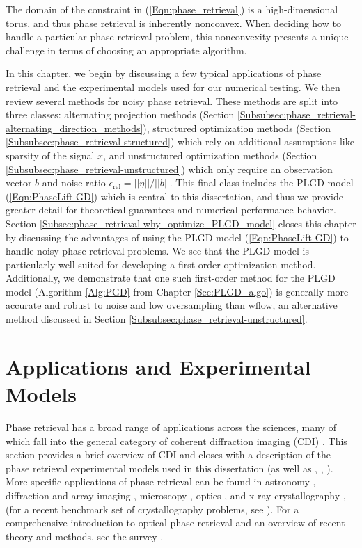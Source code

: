 The domain of the constraint in (\ref{Eqn:phase_retrieval}) is a high-dimensional torus, and thus phase retrieval is inherently nonconvex.  When deciding how to handle a particular phase retrieval problem, this  nonconvexity presents a unique challenge in terms of choosing an appropriate algorithm.  


In this chapter, we begin by discussing a few typical applications of phase retrieval and the experimental models used for our numerical testing.  
We then review several methods for noisy phase retrieval.  
These methods are split into three classes: alternating projection methods (Section \ref{Subsubsec:phase_retrieval-alternating_direction_methods}), structured optimization methods (Section \ref{Subsubsec:phase_retrieval-structured}) which rely on additional assumptions like sparsity of the signal $x$, and unstructured optimization methods (Section \ref{Subsubsec:phase_retrieval-unstructured}) which only require an observation vector $b$ and noise ratio $\epsilon_{\text{rel}} = ||\eta|| / ||b||$.  
This final class includes the PLGD model (\ref{Eqn:PhaseLift-GD}) which is central to this dissertation, and thus we provide greater detail for theoretical guarantees and numerical performance behavior.
Section \ref{Subsec:phase_retrieval-why_optimize_PLGD_model} closes this chapter by discussing the advantages of using the PLGD model (\ref{Eqn:PhaseLift-GD}) to handle noisy phase retrieval problems.
We see that the PLGD model is particularly well suited for developing a first-order optimization method.
Additionally, we demonstrate that one such first-order method for the PLGD model (Algorithm \ref{Alg:PGD} from Chapter \ref{Sec:PLGD_algo}) is generally more accurate and robust to noise and low oversampling than wflow, an alternative method discussed in Section \ref{Subsubsec:phase_retrieval-unstructured}.





\section{Applications and Experimental Models} 			\label{Subsec:phase_retrieval-applications}


Phase retrieval has a broad range of applications across the sciences, many of which fall into the general category of coherent diffraction imaging (CDI) \cite{miao1999extending}.  
This section provides a brief overview of CDI and closes with a description of the phase retrieval experimental models used in this dissertation (as well as \cite{DBLP:journals/siamis/CandesESV13}, \cite{DBLP:journals/tit/CandesLS15}, \cite{DBLP:journals/siamsc/FriedlanderM16}).
More specific applications of phase retrieval can be found in astronomy \cite{fienup1987phase}, diffraction and array imaging \cite{bunk2007diffractive} \cite{chai2010array}, microscopy \cite{miao2008extending}, optics \cite{walther1963question}, and x-ray crystallography \cite{harrison1993phase}, \cite{millane1990phase} (for a recent benchmark set of crystallography problems, see \cite{elser2017benchmark}).  
For a comprehensive introduction to optical phase retrieval and an overview of recent theory and methods, see the survey \cite{DBLP:journals/spm/ShechtmanECCMS15}.


